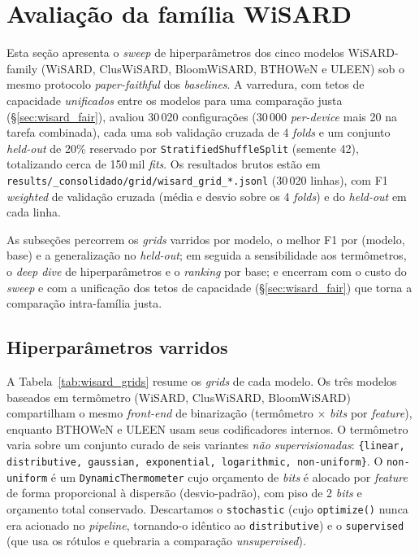 \section{Avaliação da família WiSARD}
\label{sec:wisard}

Esta seção apresenta o \emph{sweep} de hiperparâmetros dos cinco
modelos WiSARD-family (WiSARD, ClusWiSARD, BloomWiSARD, BTHOWeN e
ULEEN) sob o mesmo protocolo \emph{paper-faithful} dos
\emph{baselines}. A varredura, com tetos de capacidade
\emph{unificados} entre os modelos para uma comparação justa
(\S{}\ref{sec:wisard_fair}), avaliou 30\,020 configurações
(30\,000 \emph{per-device} mais 20 na tarefa combinada), cada uma sob
validação cruzada de 4 \emph{folds} e um conjunto \emph{held-out} de
20\% reservado por \texttt{StratifiedShuffleSplit} (semente 42),
totalizando cerca de 150\,mil \emph{fits}. Os resultados brutos estão
em \texttt{results/\_consolidado/grid/wisard\_grid\_*.jsonl}
(30\,020 linhas), com F1 \emph{weighted} de validação cruzada (média e
desvio sobre os 4 \emph{folds}) e do \emph{held-out} em cada linha.

As subseções percorrem os \emph{grids} varridos por modelo, o melhor F1
por (modelo, base) e a generalização no \emph{held-out}; em seguida a
sensibilidade aos termômetros, o \emph{deep dive} de hiperparâmetros e o
\emph{ranking} por base; e encerram com o custo do \emph{sweep} e com a
unificação dos tetos de capacidade (\S{}\ref{sec:wisard_fair}) que torna
a comparação intra-família justa.

\subsection{Hiperparâmetros varridos}

A Tabela~\ref{tab:wisard_grids} resume os \emph{grids} de cada
modelo. Os três modelos baseados em termômetro (WiSARD, ClusWiSARD,
BloomWiSARD) compartilham o mesmo \emph{front-end} de binarização
(termômetro $\times$ \emph{bits} por \emph{feature}), enquanto
BTHOWeN e ULEEN usam seus codificadores internos. O termômetro varia
sobre um conjunto curado de seis variantes \emph{não supervisionadas}:
\texttt{\{linear, distributive, gaussian, exponential, logarithmic,
non-uniform\}}. O \texttt{non-uniform} é um \texttt{DynamicThermometer}
cujo orçamento de \emph{bits} é alocado por \emph{feature} de forma
proporcional à dispersão (desvio-padrão), com piso de 2 \emph{bits} e
orçamento total conservado. Descartamos o \texttt{stochastic} (cujo
\texttt{optimize()} nunca era acionado no \emph{pipeline}, tornando-o
idêntico ao \texttt{distributive}) e o \texttt{supervised} (que usa os
rótulos e quebraria a comparação \emph{unsupervised}).

